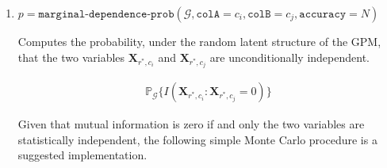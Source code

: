 \documentclass[10pt,letterpaper]{article}
\newtheorem{excercise}{Excercise}[section]
\newcommand{\set}[1]{\{#1\}}
\newcommand{\G}{\mathcal{G}}
\begin{document}
\begin{enumerate}

    Note that the samples are generated by invoking
    \begin{align*}
    {\tt simulate(} \G,
    {\tt targets} = \set{(r^*,c_i^a)} \cup \set{r^*,c_i^b} \cup \set{r^*,c_i^c},\\
    {\tt givens} = \set{(r_i^b,c_i^b,x_{(r_i^b,c_i^b)})},
    {\tt size} = 1)
    \end{align*}

    The log densities are evaluated by invoking
    \begin{align*}
    {\tt logpdf(} \G, {\tt targets} = \set{(r^*,c_i^a,\hat{a}_{j,i})}
    \cup\set{r^*,c_i^b,\hat{b}_{j,i}}\cup\set{r^*,c_i^c,,\hat{b}_{j,i}},\\
    {\tt  givens} = \set{(r_i^b,c_i^b,x_{(r_i^b,c_i^b)})}, {\tt size} = 1)
    \end{align*}

    \begin{excercise}
    Consider an alternative implementation of Algorithm \ref{alg:cmi}, where a
    single row index is drawn $r^* \sim U[0,1]$ and $N$ samples are used in
    \texttt{simulate}. Is this an equivalent implementation?
    \end{excercise}

\item $p = \texttt{marginal-dependence-prob}(\G,
    \texttt{colA}=c_i,
    \texttt{colB}=c_j,
    \texttt{accuracy}=N)$


    Computes the probability, under the random latent structure of the GPM,
    that the two variables $\mathbf{X}_{r^*,c_i}$ and $\mathbf{X}_{r^*,c_j}$ are
    unconditionally independent.

    \begin{align*}
    \mathbb{P}_\G\set{I(\mathbf{X}_{r^*,c_i} : \mathbf{X}_{r^*,c_j} = 0)}
    \end{align*}

    Given that mutual information is zero if and only the two variables are
    statistically independent, the following simple Monte Carlo procedure is a
    suggested implementation.


\end{enumerate}
\end{document}
